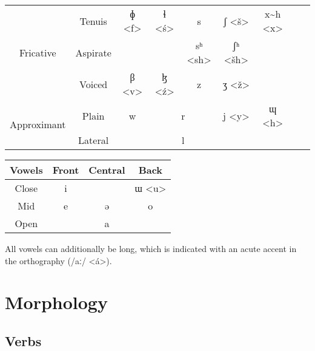 \documentclass[11pt]{article} %
\begin{document}
\begin{center}
\begin{adjustbox}{width={\textwidth},totalheight={\textheight},keepaspectratio}
\begin{tabular}{|c|c||c|c|c|c|c|c|c|}
				\multirow{3}{*}{Fricative} & Tenuis                & ɸ <f>                     & ɬ <ś>           & s           & ʃ <š>                      & x\textasciitilde{}h <x> &                        &\\ \cline{2-9}
										   & Aspirate              &                           &                 & sʰ <sh>     & ʃʰ <šh>                    &                         &                        &\\ \cline{2-9}
										   & Voiced                & β <v>                     & ɮ <ź>           & z           & ʒ <ž>                      &                         &                        &\\ \hline
										   
				\multirow{2}{*}{Approximant} & Plain               & w                         & \multicolumn{2}{c|}{r}        & j <y>                      & ɰ <h>                  &                         &\\ \cline{2-9}
											 & Lateral             &                           & \multicolumn{2}{c|}{l}        &                            &                        &                         &\\ \hline				
			\end{tabular}
			\end{adjustbox}
			
			\medskip
					
			\begin{tabular}{|c||c|c|c|}
				\hline
				\textbf{Vowels} & Front & Central & Back  \\ \hline\hline
				Close           & i     &         & ɯ <u> \\ \hline
				Mid             & e     & ə       & o     \\ \hline 
				Open            &       & a       &       \\ \hline
			\end{tabular}
		
		\end{center}

All vowels can additionally be long, which is indicated with an acute accent in the orthography (/aː/ <á>).

\section{Morphology}

\subsection{Verbs}
\end{document}
